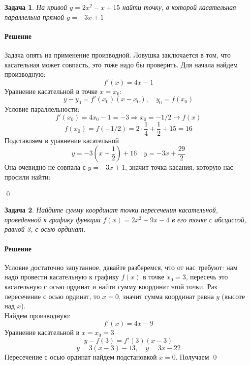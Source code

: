 \documentclass[a4paper,12pt]{report}
\newtheorem{problem}{Задача}[chapter]
\newenvironment{sol}{\paragraph{Решение}}{}
\begin{document}
	\begin{problem}
		На кривой $y=2x^2-x+15$ найти точку, в которой касательная параллельна прямой $y=-3x+1$
	\end{problem}
	\begin{sol}
		Задача опять на применение производной. Ловушка заключается в том, что касательная может совпасть, это тоже надо бы проверить. Для начала найдем производную:
		\[
		f'(x)=4x-1
		\]
		Уравнение касательной в точке $x=x_0$:
		\[
		y-y_0=f'(x_0)(x-x_0), \quad y_0=f(x_0)
		\]
		Условие параллельности:
		\[
		f'(x_0)=4x_0-1=-3 \Rightarrow x_0=-1/2 \rightarrow f(x)
		\]
		\[
		f(x_0)=f(-1/2)=2\cdot\frac{1}{4}+\frac{1}{2}+15=16
		\]
		Подставляем в уравнение касательной
		\[
		y=-3\left(x+\frac{1}{2}\right)+16\quad y=-3x+\frac{29}{2}
		\]
		Она очевидно не совпала с $y=-3x+1$, значит точка касания, которую нас просили найти:
		\begin{center}
		\end{center}
		\qed
	\end{sol}
	
	\begin{problem}
		Найдите сумму координат точки пересечения касательной, проведенной к графику функции $f(x)=2x^2-9x-4$ в его точке с абсциссой, равной 3, с осью ординат.
	\end{problem}
	\begin{sol}
		Условие достаточно запутанное, давайте разберемся, что от нас требуют: нам надо провести касательную к графику $f(x)$ в точке $x_0=3$, пересечь это касательную с осью ординат и найти сумму координат этой точки. Раз пересечение с осью ординат, то $x=0$, значит сумма координат равна $y$ (высоте над $x$).\\
		Найдем производную:
		\[
		f'(x)=4x-9
		\]
		Уравнение касательной в $x=x_0=3$
		\[
		y-f(3)=f'(3)(x-3)
		\]
		\[
		y=3(x-3)-13, \quad y=3x-22
		\]
		Пересечение с осью ординат найдем подстановкой $x=0$. Получаем  \qed
	\end{sol}
	
\end{document}
